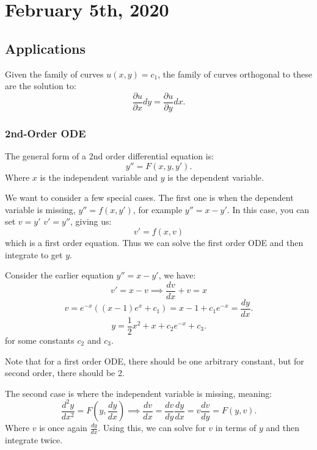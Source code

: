 \documentclass[../main/main.tex]{subfiles}
\begin{document}
\section{February  5th, 2020}
\subsection{Applications}
Given the family of curves $u(x,y) = c_1$, the family of curves orthogonal to these are the solution to: \[
\frac{\partial u}{\partial x} dy = \frac{\partial u}{\partial y} dx
.\] 
\subsubsection{2nd-Order ODE}
\begin{definition}
	The general form of a 2nd order differential equation is: \[
		y'' = F(x,y,y')
	.\] Where $x$ is the independent variable and  $y$ is the dependent variable.
\end{definition}
We want to consider a few special cases. The first one is when the dependent variable is missing, $y''=f(x,y')$, for example  $y''=x-y'$. In this case, you can set  $v=y'$ $v'=y''$, giving us: \[
	v'=f(x,v)
\]  which is a first order equation. Thus we can solve the first order ODE and then integrate to get $y$.
\begin{example}
	Consider the earlier equation $y''=x-y'$, we have: \[
	v' = x-v \implies \frac{dv}{dx}+v = x
	\] \[
	v = e^{-x}((x-1)e^{x}+c_1) = x-1+c_1e^{-x} = \frac{dy}{dx}
	.\] \[
	y = \frac{1}{2}x^2+x+c_2e^{-x}+c_3
	.\] for some constants $c_2$ and $c_3$.
\end{example}
\begin{remark}
	Note that for a first order ODE, there should be one arbitrary constant, but for second order, there should be 2.
\end{remark}
The second case is where the independent variable is missing, meaning: \[
	\frac{d^2y}{dx^2} = F(y,\frac{dy}{dx}) \implies \frac{dv}{dx} = \frac{dv}{dy} \frac{dy}{dx} =  v \frac{dv}{dy} = F(y,v)
.\] Where $v$ is once again $\frac{dy}{dx}$. Using this, we can solve for $v$ in terms of $y$ and then integrate twice.
\end{document}
